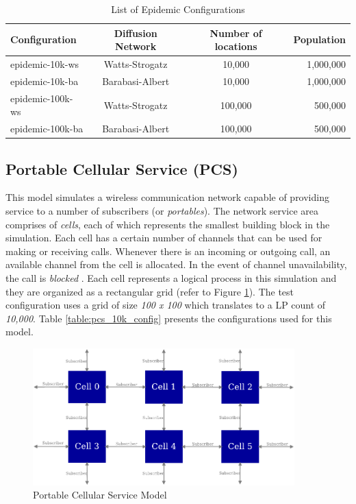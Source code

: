 \documentclass[11pt]{book}
\begin{document}
\begin{table}
    \centering
    \begin{tabular}{| l | c | c | r |}
        \hline
        \textbf{Configuration} & \textbf{Diffusion Network} & \textbf{Number of locations}
                & \textbf{Population}\\
        \hline
        epidemic-10k-ws     & Watts-Strogatz    &  10,000   & 1,000,000\\
        epidemic-10k-ba     & Barabasi-Albert   &  10,000   & 1,000,000\\
        epidemic-100k-ws    & Watts-Strogatz    &  100,000  & 500,000\\
        epidemic-100k-ba    & Barabasi-Albert   &  100,000  & 500,000\\
        \hline
    \end{tabular}
    \caption{List of Epidemic Configurations}\label{table:epidemic_configs}
\end{table}

\subsection{Portable Cellular Service (PCS)}\label{subsec:pcs}

This model simulates a wireless communication network capable of providing service to a number of subscribers
(or \emph{portables}).  The network service area comprises of \emph{cells}, each of which represents the
smallest building block in the simulation.  Each cell has a certain number of channels that can be used for
making or receiving calls.  Whenever there is an incoming or outgoing call, an available channel from the cell
is allocated.  In the event of channel unavailability, the call is \emph{blocked} \cite{lin-96-pcs}.  Each
cell represents a logical process in this simulation and they are organized as a rectangular grid (refer to
Figure \ref{fig:pcs}).  The test configuration uses a grid of size \emph{100 x 100} which translates to a LP
count of \emph{10,000}. Table \ref{table:pcs_10k_config} presents the configurations used for this model.

\begin{figure}
    \centering
    \includegraphics[width=0.9\textwidth]{figures/pcs.pdf}
    \caption{Portable Cellular Service Model}\label{fig:pcs}
\end{figure}
\end{document}

